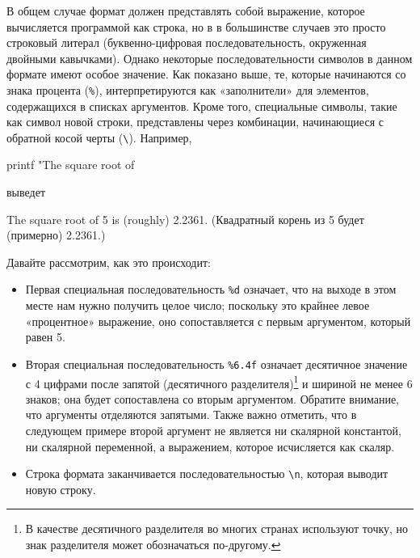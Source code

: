 В общем случае формат  должен представлять собой
выражение, которое вычисляется программой как строка, но в в
большинстве случаев это просто строковый литерал (буквенно-цифровая
последовательность, окруженная двойными кавычками). Однако некоторые
последовательности символов в данном формате имеют особое
значение. Как показано выше, те, которые начинаются со знака процента
(\texttt{\%}), интерпретируются как «заполнители» для элементов,
содержащихся в списках аргументов. Кроме того, специальные символы,
такие как символ новой строки, представлены через комбинации,
начинающиеся с обратной косой черты (\verb|\|).  Например,
\begin{code}
printf "The square root of %
\end{code}
выведет 
\begin{code}
The square root of 5 is (roughly) 2.2361.
(Квадратный корень из 5 будет (примерно) 2.2361.)
\end{code}
Давайте рассмотрим, как это происходит:
\begin{itemize}
\item Первая специальная последовательность \verb|%d| означает, что на
  выходе в этом месте нам нужно получить целое число; поскольку это
  крайнее левое «процентное» выражение, оно сопоставляется с первым
  аргументом, который равен 5.
\item Вторая специальная последовательность \verb|%6.4f| означает
  десятичное значение с 4 цифрами после запятой (десятичного
  разделителя)\footnote{В качестве десятичного разделителя во многих
    странах используют точку, но знак разделителя может обозначаться
    по-другому.} и шириной не менее 6 знаков; она будет сопоставлена
  со вторым аргументом. Обратите внимание, что аргументы отделяются
  запятыми. Также важно отметить, что в следующем примере второй
  аргумент не является ни скалярной константой, ни скалярной
  переменной, а выражением, которое исчисляется как скаляр.
\item Строка формата заканчивается последовательностью \verb|\n|,
  которая выводит новую строку.
\end{itemize}

